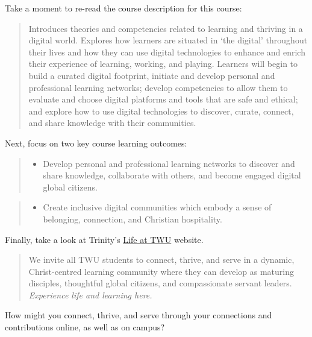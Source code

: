 \documentclass[
]{book}
\providecommand{\tightlist}{%
  \setlength{\itemsep}{0pt}\setlength{\parskip}{0pt}}
\theoremstyle{definition}
\theoremstyle{definition}
\theoremstyle{definition}
\theoremstyle{definition}
\theoremstyle{remark}
\begin{document}
\begin{reflect}
Take a moment to re-read the course description for this course:

\begin{quote}
Introduces theories and competencies related to learning and thriving in a digital world. Explores how learners are situated in `the digital' throughout their lives and how they can use digital technologies to enhance and enrich their experience of learning, working, and playing. Learners will begin to build a curated digital footprint, initiate and develop personal and professional learning networks; develop competencies to allow them to evaluate and choose digital platforms and tools that are safe and ethical; and explore how to use digital technologies to discover, curate, connect, and share knowledge with their communities.
\end{quote}

Next, focus on two key course learning outcomes:

\begin{quote}
\begin{itemize}
\tightlist
\item
  Develop personal and professional learning networks to discover and share knowledge, collaborate with others, and become engaged digital global citizens.
\end{itemize}
\end{quote}

\begin{quote}
\begin{itemize}
\tightlist
\item
  Create inclusive digital communities which embody a sense of belonging, connection, and Christian hospitality.
\end{itemize}
\end{quote}

Finally, take a look at Trinity's \href{https://www.twu.ca/life-twu}{Life at TWU} website.

\begin{quote}
We invite all TWU students to connect, thrive, and serve in a dynamic, Christ-centred learning community where they can develop as maturing disciples, thoughtful global citizens, and compassionate servant leaders.
\emph{Experience life and learning here.}
\end{quote}

How might you connect, thrive, and serve through your connections and contributions online, as well as on campus?


\end{reflect}
\end{document}
